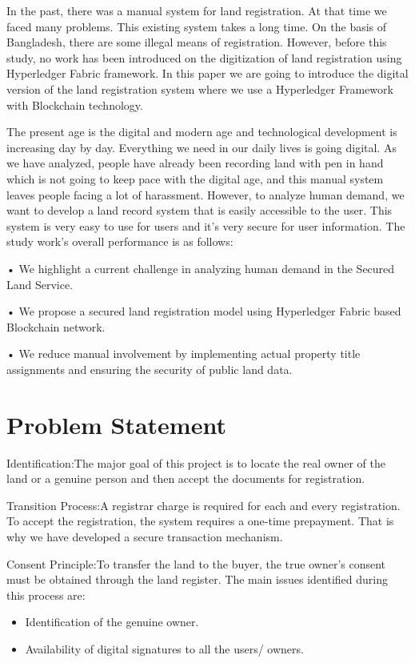 \documentclass[12pt]{ucthesis}
\begin{document}
In the past, there was a manual system for land registration.
At that time we faced many problems. This existing system
takes a long time. On the basis of Bangladesh, there are some
illegal means of registration. However, before this study, no
work has been introduced on the digitization of land registration
using Hyperledger Fabric framework. In this paper we are
going to introduce the digital version of the land registration system where we use a Hyperledger Framework with
Blockchain technology\cite{rf16}.

The present age is the digital and modern age and technological development is increasing day by day. Everything we
need in our daily lives is going digital. As we have analyzed,
people have already been recording land with pen in hand
which is not going to keep pace with the digital age, and
this manual system leaves people facing a lot of harassment.
However, to analyze human demand, we want to develop a
land record system that is easily accessible to the user. This
system is very easy to use for users and it’s very secure for
user information. The study work's overall performance is as follows: 

• We highlight a current challenge in analyzing human demand in the Secured Land Service.

• We propose a secured land registration model using Hyperledger Fabric based Blockchain network.

• We reduce manual involvement by implementing actual property title assignments and ensuring the security of public land data.


\section{Problem Statement}
\label{problemstatement}
    
Identification:The major goal of this project is to locate the real  owner of the land or a genuine person and then accept the documents for registration.

Transition Process:A registrar charge is required for each and every registration. To accept the registration, the system requires a one-time prepayment. That is why we have developed a secure transaction mechanism.

Consent Principle:To transfer the land to the buyer, the true owner's consent must be obtained through the land register. The main issues identified during this process are:
\begin{itemize}
    \item Identification of the genuine owner.
    \item Availability of digital signatures to all the users/ owners.
\end{itemize}
 
\end{document}
